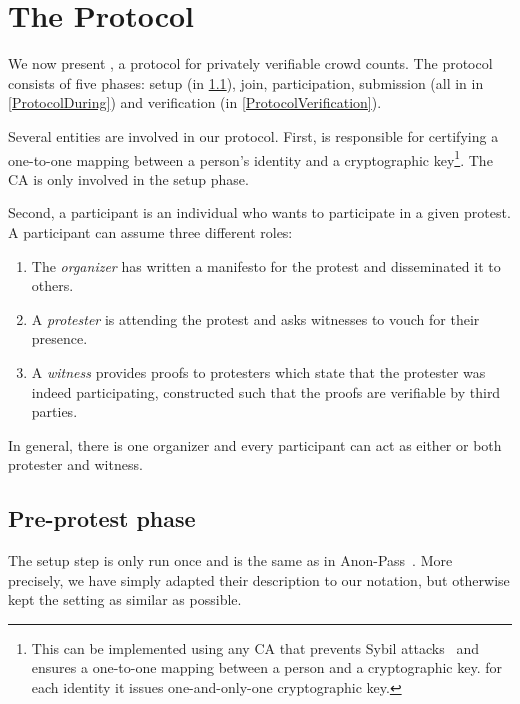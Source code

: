 \section{The \CROCUS Protocol}
\label{Protocol}


We now present \CROCUS, a protocol for privately verifiable crowd counts.
The protocol consists of five phases: setup (in \cref{ProtocolSetup}),
join, participation, submission (all in in \cref{ProtocolDuring}) and
verification (in \cref{ProtocolVerification}).

Several entities are involved in our protocol.
First,  is responsible for certifying a one-to-one mapping between a 
person's identity and a cryptographic key\footnote{%
  This can be implemented using any \ac{CA} that prevents Sybil 
  attacks~\cite{SybilAttack} and ensures a one-to-one mapping between a person 
  and a cryptographic key.
  \Ie for each identity it issues one-and-only-one cryptographic key.
}.
The \ac{CA} is only involved in the setup phase.

Second, a participant is an individual who wants to participate in a given 
protest.
A participant can assume three different roles:
\begin{enumerate}
\item The \emph{organizer} has written a manifesto for the protest and 
  disseminated it to others.
\item A \emph{protester} is attending the protest and asks witnesses to vouch 
  for their presence.
\item A \emph{witness} provides proofs to protesters which state that the 
  protester was indeed participating, constructed such that the proofs are verifiable by 
  third parties.
\end{enumerate}
In general, there is one organizer and every participant can act as
either or both protester and witness.

\subsection{Pre-protest phase}%
\label{ProtocolSetup}

The setup step is only run once and is the same as in Anon-Pass~\cite{AnonPass}.
More precisely, we have simply adapted their description to our notation, but otherwise kept the setting as similar as possible.



